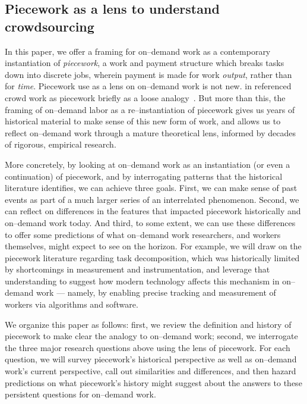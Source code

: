 \documentclass[trackingWork]{subfiles}
\begin{document}
\subsection{Piecework as a lens to understand crowdsourcing}
In this paper, we offer a framing for on--demand work as a contemporary instantiation of \textit{piecework},
a work and payment structure which breaks tasks down into discrete jobs,
wherein payment is made for work \textit{output}, rather than for \textit{time}.
Piecework use as a lens on on--demand work is not new.
\citeauthor{crowdworkFuture} in \citeyear{crowdworkFuture}
referenced crowd work as piecework briefly
as a loose analogy~\cite{crowdworkFuture}.
But more than this,
the framing of on--demand labor as a re--instantiation of piecework
gives us years of historical material to make sense of this new form of work, and allows us to reflect on--demand work through a mature theoretical lens, informed by decades of rigorous, empirical research.

More concretely, by looking at on--demand work as
an instantiation (or even a continuation) of piecework,
and by interrogating patterns that the historical literature identifies, we can achieve three goals.
First, we can make sense of past events as part of a much larger series of an interrelated phenomenon.
Second, we can reflect on differences in the features that impacted piecework historically and on--demand work today.
And third, to some extent, we can use these differences to offer some predictions of what on--demand work researchers,
and workers themselves,
might expect to see on the horizon.
For example, we will draw on the piecework literature regarding task decomposition,
which was historically limited by shortcomings in measurement and instrumentation, and
leverage that understanding to suggest how modern technology affects this mechanism in on--demand work
--- namely, by enabling precise tracking and measurement of workers via algorithms and software.

We organize this paper as follows:
first, we review the definition and history of piecework
to make clear the analogy to on--demand work;
second, we interrogate the three major research questions above using the lens of piecework. 
For each question, we will survey piecework's historical perspective as well as on--demand work's current perspective, call out similarities and differences, and then hazard predictions on what piecework's history might suggest about the answers to these persistent questions for on--demand work.

\onlyinsubfile{
  \clearpage
  \balance{}
  \printbibliography
}
\end{document}
